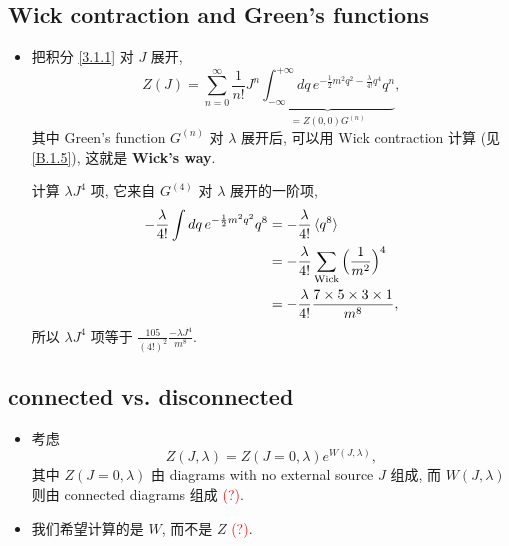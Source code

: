 \subsection{Wick contraction and Green's functions}
\begin{itemize}
	\item 把积分 \eqref{3.1.1} 对 $J$ 展开,
	\begin{equation}
		Z(J) = \sum_{n = 0}^\infty \frac{1}{n!} J^n \underbrace{\int_{- \infty}^{+ \infty} dq \, e^{- \frac{1}{2} m^2 q^2 - \frac{\lambda}{4!} q^4} q^n}_{= Z(0, 0) G^{(n)}},
	\end{equation}
	其中 Green's function $G^{(n)}$ 对 $\lambda$ 展开后, 可以用 Wick contraction 计算 (见 \eqref{B.1.5}), 这就是 \textbf{Wick's way}.
	
	\begin{tcolorbox}[title=calculation:]
		计算 $\lambda J^4$ 项, 它来自 $G^{(4)}$ 对 $\lambda$ 展开的一阶项,
		\begin{align}
			- \frac{\lambda}{4!} \int dq \, e^{- \frac{1}{2} m^2 q^2} q^8 &= - \frac{\lambda}{4!} \braket{q^8} \notag \\
			&= - \frac{\lambda}{4!} \sum_{\text{Wick}} \Big( \frac{1}{m^2} \Big)^4 \notag \\
			&= - \frac{\lambda}{4!} \frac{7 \times 5 \times 3 \times 1}{m^8}, \label{3.1.5}
		\end{align}
		所以 $\lambda J^4$ 项等于 $\frac{105}{(4!)^2} \frac{- \lambda J^4}{m^8}$.
	\end{tcolorbox}
\end{itemize}

\subsection{connected vs. disconnected}
\begin{itemize}
	\item 考虑
	\begin{equation}
		Z(J, \lambda) = Z(J = 0, \lambda) e^{W(J, \lambda)},
	\end{equation}
	其中 $Z(J = 0, \lambda)$ 由 diagrams with no external source $J$ 组成, 而 $W(J, \lambda)$ 则由 connected diagrams 组成 \textcolor{red}{(?)}.
	
	\item 我们希望计算的是 $W$, 而不是 $Z$ \textcolor{red}{(?)}.
\end{itemize}

